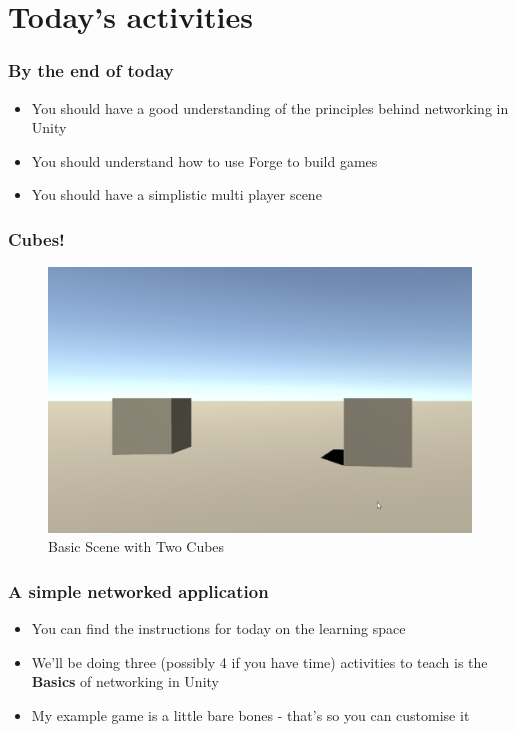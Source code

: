 \section{Today's activities}

\begin{frame}
	\frametitle{By the end of today}
	
	\begin{itemize}
		\item You should have a good understanding of the principles behind networking in Unity
		\item You should understand how to use Forge to build games
		\item You should have a simplistic multi player scene
	\end{itemize}
\end{frame}

\begin{frame}
	\frametitle{Cubes!}
	
	\begin{figure}
			\includegraphics{unity_twocubes}
			\caption{Basic Scene with Two Cubes}
	\end{figure}
\end{frame}

\begin{frame}
	\frametitle{A simple networked application}
	
	\begin{itemize}
		\item You can find the instructions for today on the learning space
		\item We'll be doing three (possibly 4 if you have time) activities to teach is the \textbf{Basics} of networking in Unity
		\item My example game is a little bare bones - that's so you can customise it 
	\end{itemize}
\end{frame}

